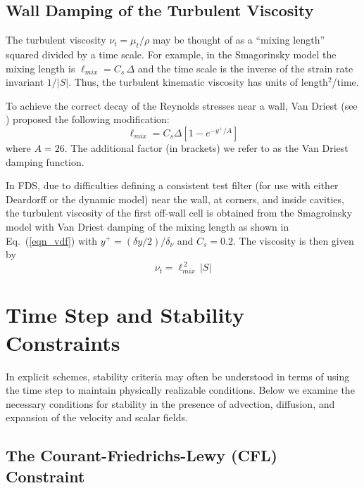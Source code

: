 \subsection{Wall Damping of the Turbulent Viscosity}
\label{sec:wall_damping}

The turbulent viscosity $\nu_t = \mu_t/\rho$ may be thought of as a ``mixing length'' squared divided by a time scale.  For example, in the Smagorinsky model the mixing length is $\ell_{mix} = C_s \,\Delta$ and the time scale is the inverse of the strain rate invariant $1/|S|$.  Thus, the turbulent kinematic viscosity has units of length$^2$/time.

To achieve the correct decay of the Reynolds stresses near a wall, Van Driest (see \cite{Wilcox:1}) proposed the following modification:
\begin{equation}
\label{eqn_vdf}
\ell_{mix} = C_s \Delta \left[ 1 - e^{-y^+/A} \right]
\end{equation}
where $A=26$.  The additional factor (in brackets) we refer to as the Van Driest damping function.

In FDS, due to difficulties defining a consistent test filter (for use with either Deardorff or the dynamic model) near the wall, at corners, and inside cavities, the turbulent viscosity of the first off-wall cell is obtained from the Smagroinsky model with Van Driest damping of the mixing length as shown in Eq.~(\ref{eqn_vdf}) with $y^+ = (\delta y/2)/\delta_\nu$ and $C_s = 0.2$.  The viscosity is then given by\begin{equation}
\label{eqn_nearwall_viscosity}
\nu_t = \ell_{mix}^{\,2}\,|S|
\end{equation}


\section{Time Step and Stability Constraints}
\label{stability}

In explicit schemes, stability criteria may often be understood in terms of using the time step to maintain physically realizable conditions.  Below we examine the necessary conditions for stability in the presence of advection, diffusion, and expansion of the velocity and scalar fields.

\subsection{The Courant-Friedrichs-Lewy (CFL) Constraint}

